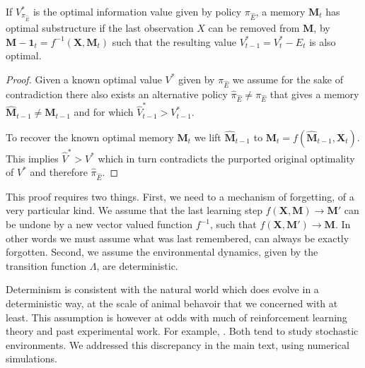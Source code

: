 \begin{theorem} \label{theorem:opt_sub} 
   If $V^*_{\pi_{\hat E}}$ is the optimal information value given by policy $\pi_{\hat E}$, a memory $\mathbf{M}_t$ has optimal substructure if the last observation $X$ can be removed from $\mathbf{M}$, by $\mathbf{M-1}_{t} = f^{-1}(\mathbf{X}, \mathbf{M}_t)$ such that the resulting value $V^*_{t-1} = V^*_{t} - E_{t}$ is also optimal. 
\end{theorem}
\begin{proof}
	Given a known optimal value $V^*$ given by $\pi_{\hat E}$ we assume for the sake of contradiction there also exists an alternative policy $\hat \pi_{\hat E} \neq \pi_{\hat E}$ that gives a memory $\hat{\mathbf{M}}_{t-1} \neq \mathbf{M}_{t-1}$ and for which $\hat V^*_{t-1} > V^*_{t-1}$. 
	
	To recover the known optimal memory $\mathbf{M}_t$ we lift $\hat{\mathbf{M}}_{t-1}$ to $\mathbf{M}_t = f(\hat{\mathbf{M}}_{t-1}, \mathbf{X}_t)$. This implies $\hat V^* > V^*$ which in turn contradicts the purported original optimality of $V^*$ and therefore $\hat \pi_{\hat E}$.
\end{proof}

This proof requires two things. First, we need to a mechanism of forgetting, of a very particular kind. We assume that the last learning step $f(\mathbf{X}, \mathbf{M}) \rightarrow \mathbf{M}'$ can be undone by a new vector valued function $f^{-1}$, such that $f(\mathbf{X}, \mathbf{M'}) \rightarrow \mathbf{M}$. In other words we must assume what was last remembered, can always be exactly forgotten. Second, we assume the environmental dynamics, given by the transition function $\Lambda$, are deterministic. 

Determinism is consistent with the natural world which does evolve in a deterministic way, at the scale of animal behavoir that we concerned with at least. This assumption is however at odds with much of reinforcement learning theory \cite{Sutton2018} and past experimental work. For example, \cite{Gershman2018}. Both tend to study stochastic environments. We addressed this discrepancy in the main text, using numerical simulations.



